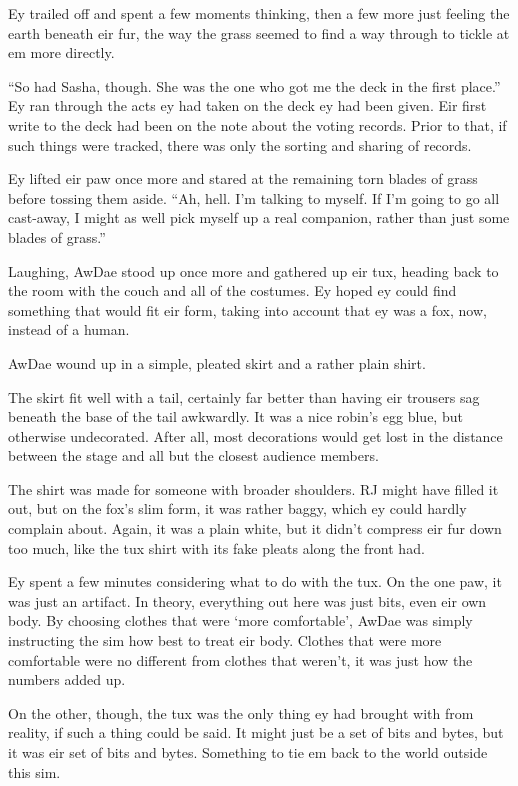 Ey trailed off and spent a few moments thinking, then a few more just feeling the earth beneath eir fur, the way the grass seemed to find a way through to tickle at em more directly.

``So had Sasha, though. She was the one who got me the deck in the first place.'' Ey ran through the acts ey had taken on the deck ey had been given. Eir first write to the deck had been on the note about the voting records. Prior to that, if such things were tracked, there was only the sorting and sharing of records.

Ey lifted eir paw once more and stared at the remaining torn blades of grass before tossing them aside. ``Ah, hell. I'm talking to myself. If I'm going to go all cast-away, I might as well pick myself up a real companion, rather than just some blades of grass.''

Laughing, AwDae stood up once more and gathered up eir tux, heading back to the room with the couch and all of the costumes. Ey hoped ey could find something that would fit eir form, taking into account that ey was a fox, now, instead of a human.

\secdiv

AwDae wound up in a simple, pleated skirt and a rather plain shirt.

The skirt fit well with a tail, certainly far better than having eir trousers sag beneath the base of the tail awkwardly. It was a nice robin's egg blue, but otherwise undecorated. After all, most decorations would get lost in the distance between the stage and all but the closest audience members.

The shirt was made for someone with broader shoulders. RJ might have filled it out, but on the fox's slim form, it was rather baggy, which ey could hardly complain about. Again, it was a plain white, but it didn't compress eir fur down too much, like the tux shirt with its fake pleats along the front had.


Ey spent a few minutes considering what to do with the tux. On the one paw, it was just an artifact. In theory, everything out here was just bits, even eir own body. By choosing clothes that were `more comfortable', AwDae was simply instructing the sim how best to treat eir body. Clothes that were more comfortable were no different from clothes that weren't, it was just how the numbers added up.

On the other, though, the tux was the only thing ey had brought with from reality, if such a thing could be said. It might just be a set of bits and bytes, but it was eir set of bits and bytes. Something to tie em back to the world outside this sim.

